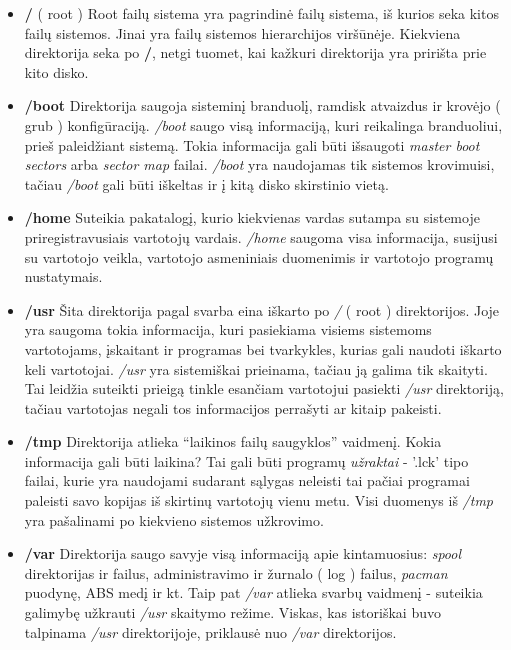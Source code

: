 \begin{itemize}
  \item \textbf{/} ( root ) Root failų sistema yra pagrindinė failų
    sistema, iš kurios seka kitos failų sistemos. Jinai yra failų
    sistemos hierarchijos viršūnėje. Kiekviena direktorija seka po
    \textbf{/}, netgi tuomet, kai kažkuri direktorija yra pririšta
    prie kito disko.
  \item \textbf{/boot} Direktorija saugoja sisteminį branduolį,
    ramdisk atvaizdus ir krovėjo ( grub )
    konfigūraciją. \textsl{/boot} saugo visą informaciją, kuri
    reikalinga branduoliui, prieš paleidžiant sistemą. Tokia
    informacija gali būti išsaugoti \textsl{master boot sectors} arba
    \textsl{sector map} failai. \textsl{/boot} yra naudojamas tik
    sistemos krovimuisi, tačiau \textsl{/boot} gali būti iškeltas ir į
    kitą disko skirstinio vietą.
  \item \textbf{/home} Suteikia pakatalogį, kurio kiekvienas vardas
    sutampa su sistemoje priregistravusiais vartotojų
    vardais. \textsl{/home} saugoma visa informacija, susijusi su
    vartotojo veikla, vartotojo asmeniniais duomenimis ir vartotojo
    programų nustatymais.
  \item \textbf{/usr} Šita direktorija pagal svarba eina iškarto po
    \textsl{/} ( root ) direktorijos. Joje yra saugoma tokia
    informacija, kuri pasiekiama visiems sistemoms vartotojams,
    įskaitant ir programas bei tvarkykles, kurias gali naudoti iškarto
    keli vartotojai. \textsl{/usr} yra sistemiškai prieinama, tačiau
    ją galima tik skaityti. Tai leidžia suteikti prieigą tinkle
    esančiam vartotojui pasiekti \textsl{/usr} direktoriją, tačiau
    vartotojas negali tos informacijos perrašyti ar kitaip pakeisti.
  \item \textbf{/tmp} Direktorija atlieka ``laikinos failų saugyklos''
    vaidmenį. Kokia informacija gali būti laikina? Tai gali būti
    programų \textsl{užraktai} - '.lck' tipo failai, kurie yra
    naudojami sudarant sąlygas neleisti tai pačiai programai paleisti
    savo kopijas iš skirtinų vartotojų vienu metu. Visi duomenys iš
    \textsl{/tmp} yra pašalinami po kiekvieno sistemos užkrovimo.
  \item \textbf{/var} Direktorija saugo savyje visą informaciją apie
    kintamuosius: \textsl{spool} direktorijas ir failus,
    administravimo ir žurnalo ( log ) failus, \textsl{pacman} puodynę,
    ABS medį ir kt. Taip pat \textsl{/var} atlieka svarbų vaidmenį -
    suteikia galimybę užkrauti \textsl{/usr} skaitymo režime. Viskas,
    kas istoriškai buvo talpinama \textsl{/usr} direktorijoje,
    priklausė nuo \textsl{/var} direktorijos.
\end{itemize}

